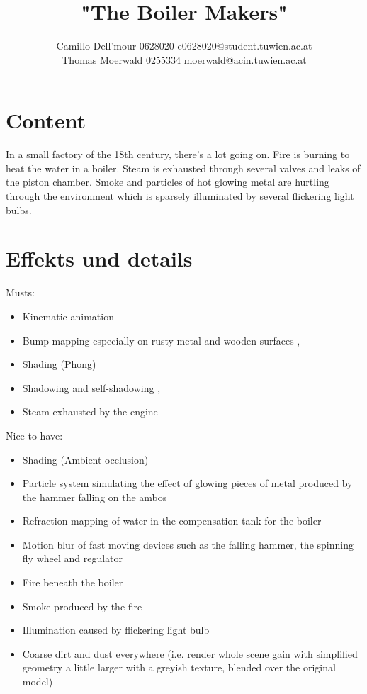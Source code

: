 \documentclass{scrartcl}
\title{"The Boiler Makers"}
\author{Camillo Dell'mour 0628020 e0628020@student.tuwien.ac.at\\ Thomas Moerwald 0255334 moerwald@acin.tuwien.ac.at}
\begin{document}
\maketitle

\section{Content}
In a small factory of the 18th century, there's a lot going on. Fire is burning to heat the water in a boiler. Steam is exhausted through several valves and leaks of the piston chamber. Smoke and particles of hot glowing metal are hurtling through the environment which is sparsely illuminated by several flickering light bulbs.

\section{Effekts und details}
Musts:
\begin{itemize}
	\item Kinematic animation
	\item Bump mapping especially on rusty metal and wooden surfaces \cite{moeller1999realtime}, \cite{dietrich2000hardware}
	\item Shading (Phong)
	\item Shadowing and self-shadowing \cite{nagy2000realtime}, \cite{ing2000ground}
	\item Steam exhausted by the engine
\end{itemize}
Nice to have:
\begin{itemize}
	\item Shading (Ambient occlusion)
	\item Particle system simulating the effect of glowing pieces of metal produced by the hammer falling on the ambos \cite{van2000building}
	\item Refraction mapping of water in the compensation tank for the boiler \cite{vlachos2000refraction}
	\item Motion blur of fast moving devices such as the falling hammer, the spinning fly wheel and regulator \cite{rosado2007motion}
	\item Fire beneath the boiler %
	\item Smoke produced by the fire %
	\item Illumination caused by flickering light bulb
	\item Coarse dirt and dust everywhere (i.e. render whole scene gain with simplified geometry a little larger with a greyish texture, blended over the original model)
\end{itemize}
\end{document}
